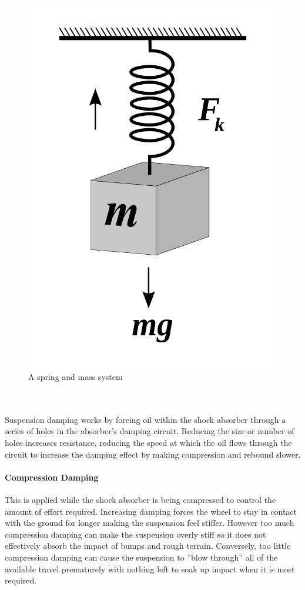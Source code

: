 		\begin{figure}[h!]
			\centering
			\includegraphics[scale=0.2]{../images/spring_and_mass.png}
			\caption{A spring and mass system}
			\label{fig:spring_and_mass}
		\end{figure}
		\\\\
		Suspension damping works by forcing oil within the shock absorber through a series of holes in the absorber’s damping circuit. Reducing the size or number	of holes increases resistance, reducing the speed at which the oil flows through the circuit to increase the damping effect by making compression and rebound slower.
	\paragraph{Compression Damping} 
		This is applied while the shock absorber is being compressed to control the amount of effort required. Increasing damping forces the wheel to stay in contact with the ground for longer making the suspension feel stiffer. However too much compression damping can make the suspension overly stiff so it does not effectively absorb the impact of bumps and rough terrain. Conversely, too little compression damping can cause the suspension to ”blow through” all of the available travel prematurely with nothing left to soak up impact when it is most required. 
